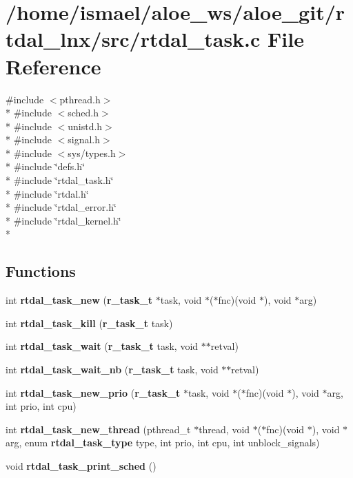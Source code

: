 \section{/home/ismael/aloe\-\_\-ws/aloe\-\_\-git/rtdal\-\_\-lnx/src/rtdal\-\_\-task.c File Reference}
\label{rtdal__task_8c}
{\ttfamily \#include $<$pthread.\-h$>$}\\*
{\ttfamily \#include $<$sched.\-h$>$}\\*
{\ttfamily \#include $<$unistd.\-h$>$}\\*
{\ttfamily \#include $<$signal.\-h$>$}\\*
{\ttfamily \#include $<$sys/types.\-h$>$}\\*
{\ttfamily \#include \char`\"{}defs.\-h\char`\"{}}\\*
{\ttfamily \#include \char`\"{}rtdal\-\_\-task.\-h\char`\"{}}\\*
{\ttfamily \#include \char`\"{}rtdal.\-h\char`\"{}}\\*
{\ttfamily \#include \char`\"{}rtdal\-\_\-error.\-h\char`\"{}}\\*
{\ttfamily \#include \char`\"{}rtdal\-\_\-kernel.\-h\char`\"{}}\\*
\subsection*{Functions}
\begin{DoxyCompactItemize}
\item 
int {\bf rtdal\-\_\-task\-\_\-new} ({\bf r\-\_\-task\-\_\-t} $\ast$task, void $\ast$($\ast$fnc)(void $\ast$), void $\ast$arg)
\item 
int {\bf rtdal\-\_\-task\-\_\-kill} ({\bf r\-\_\-task\-\_\-t} task)
\item 
int {\bf rtdal\-\_\-task\-\_\-wait} ({\bf r\-\_\-task\-\_\-t} task, void $\ast$$\ast$retval)
\item 
int {\bf rtdal\-\_\-task\-\_\-wait\-\_\-nb} ({\bf r\-\_\-task\-\_\-t} task, void $\ast$$\ast$retval)
\item 
int {\bf rtdal\-\_\-task\-\_\-new\-\_\-prio} ({\bf r\-\_\-task\-\_\-t} $\ast$task, void $\ast$($\ast$fnc)(void $\ast$), void $\ast$arg, int prio, int cpu)
\item 
int {\bf rtdal\-\_\-task\-\_\-new\-\_\-thread} (pthread\-\_\-t $\ast$thread, void $\ast$($\ast$fnc)(void $\ast$), void $\ast$arg, enum {\bf rtdal\-\_\-task\-\_\-type} type, int prio, int cpu, int unblock\-\_\-signals)
\item 
void {\bf rtdal\-\_\-task\-\_\-print\-\_\-sched} ()
\end{DoxyCompactItemize}
